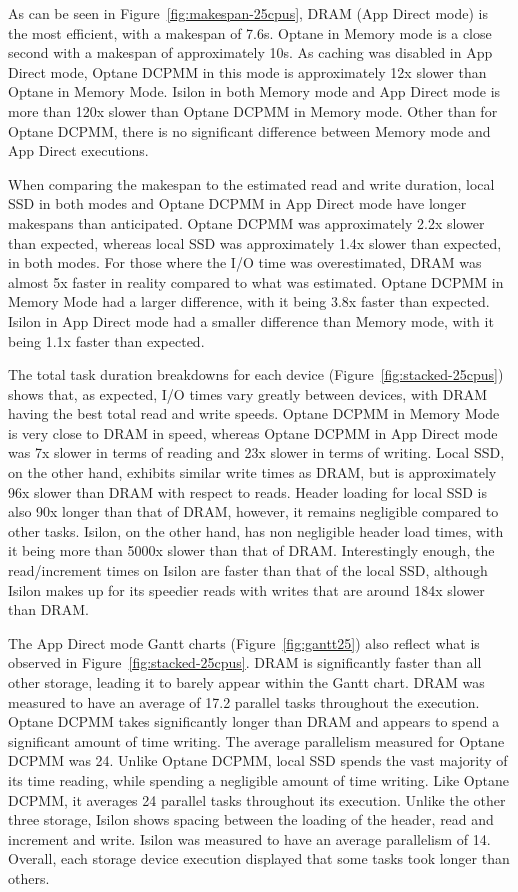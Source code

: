 \documentclass[conference]{IEEEtran}
\begin{document}
As can be seen in Figure~\ref{fig:makespan-25cpus}, DRAM (App Direct mode) is the 
most efficient, with a makespan of 7.6s. Optane in Memory mode is a close second
with a makespan of approximately 10s. As caching was disabled in App Direct mode, 
Optane DCPMM in this mode is approximately 
12x slower than Optane in Memory Mode. Isilon in both Memory mode and App Direct 
mode is more than 120x slower than Optane DCPMM in Memory mode. Other than for Optane DCPMM, 
there is no significant difference between Memory mode and App Direct executions.

When comparing the makespan to the estimated read and write duration, local SSD
in both modes and Optane DCPMM in App Direct mode have longer makespans than anticipated.
Optane DCPMM was approximately 2.2x slower than expected, whereas local SSD was approximately
1.4x slower than expected, in both modes. For those where the I/O time was overestimated,
DRAM was almost 5x faster in reality compared to what was estimated. Optane DCPMM in Memory Mode
had a larger difference, with it being 3.8x faster than expected. Isilon in App Direct
mode had a smaller difference than Memory mode, with it being 1.1x faster than expected.


The total task duration breakdowns for each device (Figure~\ref{fig:stacked-25cpus})
shows that, as expected, I/O times vary greatly between devices, with DRAM having the
best total read and write speeds. Optane DCPMM in Memory Mode is very close to DRAM in speed,
whereas Optane DCPMM in App Direct mode was 7x slower in terms of reading and 23x slower in terms
of writing. Local SSD, on the other hand, exhibits similar write times as DRAM, but is
approximately 96x slower than DRAM with respect to reads. Header loading for local SSD is also 90x longer
than that of DRAM, however, it remains negligible compared to other tasks. Isilon, on the 
other hand, has non negligible header load times, with it being more than 5000x
slower than that of DRAM. Interestingly enough, the read/increment times on Isilon are
faster than that of the local SSD, although Isilon makes up for its speedier reads with 
writes that are around 184x slower than DRAM.


The App Direct mode Gantt charts (Figure~\ref{fig:gantt25}) also reflect what is observed in Figure~\ref{fig:stacked-25cpus}.
DRAM is significantly faster than all other storage, leading it to barely appear within the Gantt chart.
DRAM was measured to have an average of 17.2 parallel tasks throughout the execution. Optane DCPMM takes
significantly longer than DRAM and appears to spend a significant amount of time writing. The average
parallelism measured for Optane DCPMM was 24. Unlike Optane DCPMM, local SSD spends the vast majority of its time
reading, while spending a negligible amount of time writing. Like Optane DCPMM, it averages 24 parallel tasks
throughout its execution. Unlike the other three storage, Isilon shows spacing between the loading of the header,
read and increment and write. Isilon was measured to have an average parallelism of 14. Overall, each storage device
execution displayed that some tasks took longer than others.
\end{document}
